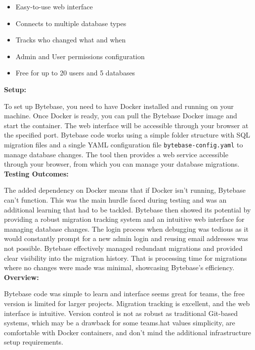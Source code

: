 \documentclass[11pt,a4paper]{article}
\begin{document}
\begin{itemize}
    \item Easy-to-use web interface
    \item Connects to multiple database types
    \item Tracks who changed what and when
    \item Admin and User permissions configuration
    \item Free for up to 20 users and 5 databases
\end{itemize}

\textbf{Setup:}

To set up Bytebase, you need to have Docker installed and running on your machine.
Once Docker is ready, you can pull the Bytebase Docker image and start the container.
The web interface will be accessible through your browser at the specified port.
Bytebase code works using a simple folder structure with SQL migration files and a single YAML configuration file \texttt{bytebase-config.yaml} to manage database changes.
The tool then provides a web service accessible through your browser, from which you can manage your database migrations.\\

\textbf{Testing Outcomes:}

The added dependency on Docker means that if Docker isn't running, Bytebase can't function.
This was the main hurdle faced during testing and was an additional learning that had to be tackled.
Bytebase then showed its potential by providing a robust migration tracking system and an intuitive web interface for managing database changes.
The login process when debugging was tedious as it would constantly prompt for a new admin login and reusing email addresses was not possible.
Bytebase effectively managed redundant migrations and provided clear visibility into the migration history.
That is processing time for migrations where no changes were made was minimal, showcasing Bytebase's efficiency.\\

\textbf{Overview:}

Bytebase code was simple to learn and interface seems great for teams, the free version is limited for larger projects.
Migration tracking is excellent, and the web interface is intuitive.
Version control is not as robust as traditional Git-based systems, which may be a drawback for some teams.hat values simplicity, are comfortable with Docker containers, and don't mind the additional infrastructure setup requirements.\\
\end{document}
